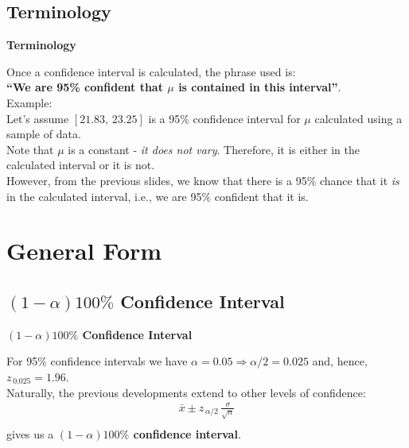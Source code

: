 \documentclass[compress]{beamer}        %
\makeatletter
\newcommand{\tcb}{\textcolor{beamer@blendedblue}}
\makeatother
\begin{document}
\subsection{Terminology}
\begin{frame}{\bf \tcb{Terminology}}

Once a confidence interval is calculated, the phrase used is:\\[0.1cm]
{\bf``We are 95\% confident that {\boldmath$\mu$} is contained in this interval''}.\\[1cm]


Example:\\[0.2cm]
Let's assume $[21.83,\,23.25]$ is a 95\% confidence interval for $\mu$ calculated using a sample of data.\\[0.3cm]
Note that $\mu$ is a constant - \emph{it does not vary}. Therefore, it is either in the calculated interval or it is not.\\[0.3cm]
However, from the previous slides, we know that there is a 95\% chance that it \emph{is} in the calculated interval, i.e., we are 95\% confident that it is.%



\end{frame}


\section{General Form}
\subsection{$(1-\alpha)100\%$ Confidence Interval}
\begin{frame}{\bf \tcb{$(1-\alpha)100\%$ Confidence Interval}}

For 95\% confidence intervals we have $\alpha = 0.05 \Rightarrow \alpha/2 = 0.025$ and, hence, $z_{\,0.025} = 1.96$.\\[0.8cm]

Naturally, the previous developments extend to other levels of confidence:
\begin{align*}
\boxed{\bar x \pm z_{\,\alpha/2}\,\frac{\sigma}{\sqrt{n}}}\\
\end{align*}
gives us a {\bf {\boldmath$(1-\alpha)100\%$} confidence interval}.

\end{frame}
\end{document}
